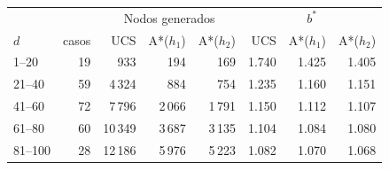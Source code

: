 \begin{tabular}{lr|rrr|rrr}
\hline
 & & \multicolumn{3}{c|}{Nodos generados} & \multicolumn{3}{c}{$b^*$} \\
$d$ & casos & UCS & A*($h_1$) & A*($h_2$) & UCS & A*($h_1$) & A*($h_2$) \\
\hline
1--20 & 19 & 933 & 194 & 169 & 1.740 & 1.425 & 1.405 \\
21--40 & 59 & 4\,324 & 884 & 754 & 1.235 & 1.160 & 1.151 \\
41--60 & 72 & 7\,796 & 2\,066 & 1\,791 & 1.150 & 1.112 & 1.107 \\
61--80 & 60 & 10\,349 & 3\,687 & 3\,135 & 1.104 & 1.084 & 1.080 \\
81--100 & 28 & 12\,186 & 5\,976 & 5\,223 & 1.082 & 1.070 & 1.068 \\
\hline
\end{tabular}
